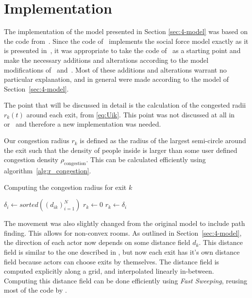 \section{Implementation}
The implementation of the model presented in Section \ref{sec:4-model} was based on the code from~\citet{Hardmeier2012}. Since the code of~\citet{Hardmeier2012} implements the social force model exactly as it is presented in~\citet{Helbing2000}, it was appropriate to take the code of~\citet{Hardmeier2012} as a starting point and make the necessary additions and alterations according to the model modifications of~\citet{Zainuddin2010} and~\citet{Wang2016}. Most of these additions and alterations warrant no particular explanation, and in general were made according to the model of Section~\ref{sec:4-model}.

The point that will be discussed in detail is the calculation of the congested radii $r_k(t)$ around each exit, from \eqref{eq:Uik}. This point was not discussed at all in~\citet{Zainuddin2010} or~\citet{Wang2016} and therefore a new implementation was needed.

Our congestion radius $r_k$ is defined as the radius of the largest semi-circle around the exit such that the density of people inside is larger than some user defined congestion density $\rho_{\textrm{congestion}}$. This can be calculated efficiently using algorithm~\ref{alg:r_congestion}.

\begin{algorithm}
	\label{alg:r_congestion}
	\caption{Computing the congestion radius for exit $k$}
	\begin{algorithmic}
		\State $\delta_i \gets sorted((d_{ik})_{i=1}^{N})$   
		\State $r_k \gets 0$
				\State $r_k \gets \delta_i$
			\Else
				\State {}
			\EndIf
		\EndFor{}
		\State {}
	\end{algorithmic}
\end{algorithm}

The movement was also slightly changed from the original model to include path finding. This allows for non-convex rooms. As outlined in Section~\ref{sec:4-model}, the direction of each actor now depends on some distance field $d_k$. This distance field is similar to the one described in \citet{Hardmeier2012}, but now each exit has it's own distance field because actors can choose exits by themselves. The distance field is computed explicitly along a grid, and interpolated linearly in-between. Computing this distance field can be done efficiently using \emph{Fast Sweeping}, reusing most of the code by \citeauthor{Hardmeier2012}. 

